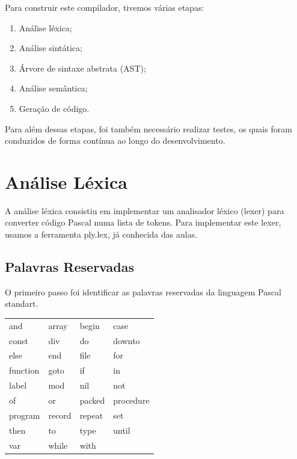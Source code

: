 \documentclass[12pt,a4paper]{report}
\begin{document}
\vspace{1em}

Para construir este compilador, tivemos várias etapas:
\begin{enumerate}
    \item Análise léxica;
    \item Análise sintática;
    \item Árvore de sintaxe abstrata (AST);
    \item Análise semântica;
    \item Geração de código.
\end{enumerate}

Para além dessas etapas, foi também necessário realizar testes, os quais foram conduzidos de forma contínua ao longo do desenvolvimento.

\chapter{Análise Léxica}

A análise léxica consistiu em implementar um analisador léxico (lexer) para converter código Pascal numa lista de tokens. Para implementar este lexer,
usamos a ferramenta ply.lex, já conhecida das aulas.

\section{Palavras Reservadas}

O primeiro passo foi identificar as palavras reservadas da linguagem Pascal standart.

\begin{center}
\begin{tabular}{>{\ttfamily} l >{\ttfamily} l >{\ttfamily} l >{\ttfamily} l}
\toprule
and & array & begin & case \\
const & div & do & downto \\
else & end & file & for \\
function & goto & if & in \\
label & mod & nil & not \\
of & or & packed & procedure \\
program & record & repeat & set \\
then & to & type & until \\
var & while & with & \\
\bottomrule
\end{tabular}
\end{center}
\end{document}

